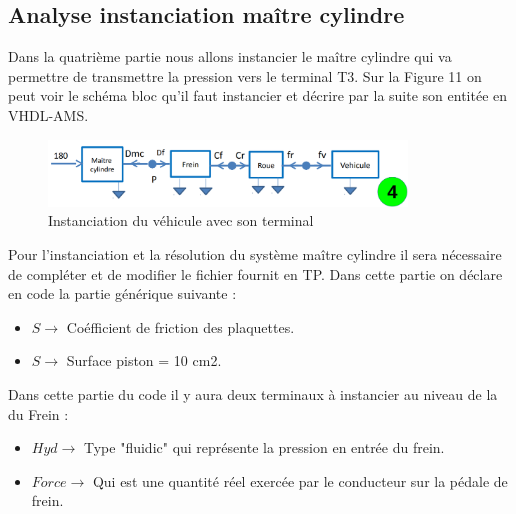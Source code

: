 \subsection{Analyse instanciation maître cylindre}
Dans la quatrième partie nous allons instancier le maître cylindre qui va permettre de transmettre la pression vers le terminal T3. Sur la Figure 11 on peut voir le schéma bloc qu'il faut instancier et décrire par la suite son entitée en VHDL-AMS.

\begin{figure}[h]
    \centering
    \includegraphics[width=0.85\textwidth]{images/quatre.png}
    \caption{Instanciation du véhicule avec son terminal}
\end{figure}
\newpage

Pour l'instanciation et la résolution du système maître cylindre  il sera nécessaire de compléter et de modifier le fichier fournit en TP. Dans cette partie on déclare en code la partie générique suivante :\\
\begin{itemize}
    \item $S    \rightarrow$ Coéfficient de friction des plaquettes.
    \item $S    \rightarrow$ Surface piston = 10 cm2.
\end{itemize}

Dans cette partie du code il y aura deux terminaux à instancier au niveau de la du Frein :

\begin{itemize}
    \item $Hyd    \rightarrow$ Type "fluidic" qui représente la pression en entrée du frein.
    \item $Force    \rightarrow$ Qui est une quantité réel exercée par le conducteur sur la pédale de frein.
\end{itemize}

